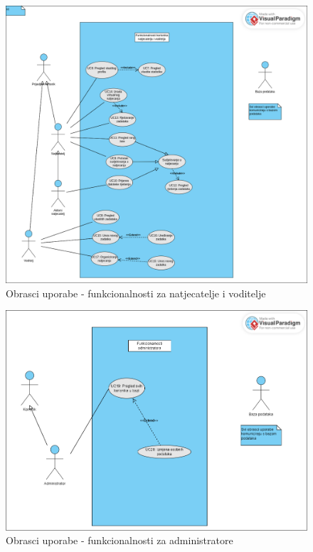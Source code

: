 					\begin{figure}[H]
						\includegraphics[scale=0.4]{dijagrami/obrasci_uporabe2.png} 
						\centering
						\caption{Obrasci uporabe - funkcionalnosti za natjecatelje i voditelje}
						\label{fig:obrasci_uporabe2}
					\end{figure}
					
					\begin{figure}[H]
						\includegraphics[scale=0.4]{dijagrami/obrasci_uporabe3.png} 
						\centering
						\caption{Obrasci uporabe - funkcionalnosti za administratore}
						\label{fig:obrasci_uporabe3}
					\end{figure}
				\eject		
				
